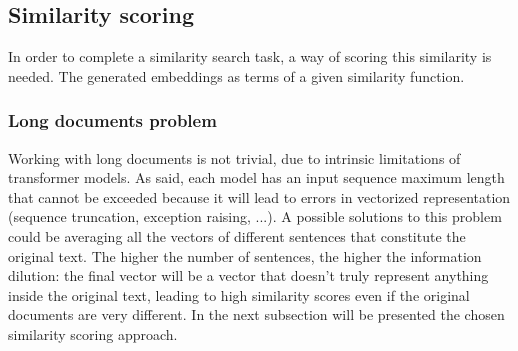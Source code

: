 \documentclass[\main/main.tex]{subfiles}
\begin{document}
\subsection{Similarity scoring}
In order to complete a similarity search task, a way of scoring this similarity is needed. The generated embeddings as terms of a given similarity function. 
\subsubsection{Long documents problem}
Working with long documents is not trivial, due to intrinsic limitations of transformer models. As said, each model has an input sequence maximum length that cannot be exceeded because it will lead to errors in vectorized representation (sequence truncation, exception raising, ...). A possible solutions to this problem could be averaging all the vectors of different sentences that constitute the original text. The higher the number of sentences, the higher the information dilution: the final vector will be a vector that doesn't truly represent anything inside the original text, leading to high similarity scores even if the original documents are very different. In the next subsection will be presented the chosen similarity scoring approach.
\end{document}
